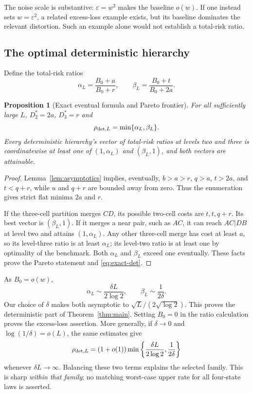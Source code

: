 \documentclass[11pt]{article}
\newtheorem{proposition}[theorem]{Proposition}
\theoremstyle{remark}\newtheorem{remark}[theorem]{Remark}
\begin{document}
The noise scale is substantive: $\varepsilon=w^2$ makes the baseline
$o(w)$. If one instead sets $w=\varepsilon^2$, a related excess-loss
example exists, but its baseline dominates the relevant distortion. Such
an example alone would not establish a total-risk ratio.

\subsection{The optimal deterministic hierarchy}
Define the total-risk ratios
\begin{equation}
 \alpha_L=\frac{B_0+a}{B_0+r},\qquad
 \beta_L=\frac{B_0+t}{B_0+2a}.
 \label{eq:alpha-beta}
\end{equation}
\begin{proposition}[Exact eventual formula and Pareto frontier]
\label{prop:pareto}
For all sufficiently large $L$, $D_2^*=2a$, $D_3^*=r$ and
\begin{equation}
 \rho_{{\rm det},L}=\min\{\alpha_L,\beta_L\}.
 \label{eq:exact-det}
\end{equation}
Every deterministic hierarchy's vector of total-risk ratios at levels two
and three is coordinatewise at least one of
$(1,\alpha_L)$ and $(\beta_L,1)$, and both vectors are attainable.
\end{proposition}
\begin{proof}
Lemma~\ref{lem:asymptotics} implies, eventually,
$b>a>r$, $q>a$, $t>2a$, and $t<q+r$, while $u$ and $q+r$ are bounded
away from zero. Thus the enumeration gives strict flat minima $2a$ and $r$.

If the three-cell partition merges $CD$, its possible two-cell costs are
$t,t,q+r$. Its best vector is $(\beta_L,1)$. If it merges a near pair,
such as $AC$, it can reach $AC|DB$ at level two and attains
$(1,\alpha_L)$. Any other three-cell merge has cost at least $a$, so its
level-three ratio is at least $\alpha_L$; its level-two ratio is at least
one by optimality of the benchmark. Both $\alpha_L$ and $\beta_L$ exceed
one eventually. These facts prove the Pareto statement and
\eqref{eq:exact-det}.
\end{proof}

As $B_0=o(w)$,
\[
 \alpha_L\sim\frac{\delta L}{2\log2},\qquad
 \beta_L\sim\frac1{2\delta}.
\]
Our choice of $\delta$ makes both asymptotic to
$\sqrt L/(2\sqrt{\log2})$. This proves the deterministic part of
Theorem~\ref{thm:main}. Setting $B_0=0$ in the ratio calculation proves
the excess-loss assertion. More generally, if $\delta\to0$ and
$\log(1/\delta)=o(L)$, the same estimates give
\[
 \rho_{{\rm det},L}=(1+o(1))
 \min\left\{\frac{\delta L}{2\log2},\frac1{2\delta}\right\}
\]
whenever $\delta L\to\infty$. Balancing these two terms explains the
selected family. This is sharp \emph{within that family}; no matching
worst-case upper rate for all four-state laws is asserted.
\end{document}
